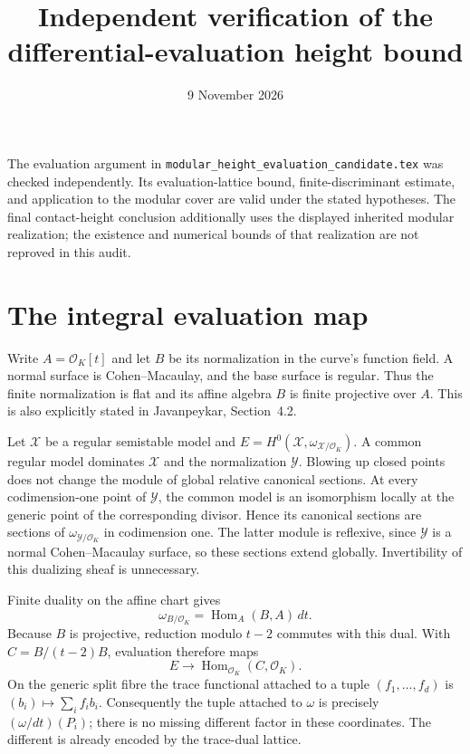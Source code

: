 \documentclass[11pt]{article}
\title{Independent verification of the differential-evaluation height bound}
\author{}\date{9 November 2026}
\newcommand{\OK}{\mathcal O_K}
\begin{document}
\maketitle

The evaluation argument in
\nolinkurl{modular_height_evaluation_candidate.tex} was checked
independently. Its evaluation-lattice bound, finite-discriminant
estimate, and application to the modular cover are valid under the
stated hypotheses. The final contact-height conclusion additionally
uses the displayed inherited modular realization; the existence and
numerical bounds of that realization are not reproved in this audit.

\section{The integral evaluation map}
Write $A=\OK[t]$ and let $B$ be its normalization in the curve's
function field. A normal surface is Cohen--Macaulay, and the base
surface is regular. Thus the finite normalization is flat and its
affine algebra $B$ is finite projective over $A$. This is also
explicitly stated in Javanpeykar, Section~4.2.

Let $\mathcal X$ be a regular semistable model and
$E=H^0(\mathcal X,\omega_{\mathcal X/\OK})$. A common regular
model dominates $\mathcal X$ and the normalization $\mathcal Y$.
Blowing up closed points does not change the module of global
relative canonical sections. At every codimension-one point of
$\mathcal Y$, the common model is an isomorphism locally at the
generic point of the corresponding divisor. Hence its canonical
sections are sections of $\omega_{\mathcal Y/\OK}$ in codimension
one. The latter module is reflexive, since $\mathcal Y$ is a
normal Cohen--Macaulay surface, so these sections extend globally.
Invertibility of this dualizing sheaf is unnecessary.

Finite duality on the affine chart gives
\[
 \omega_{B/\OK}=\operatorname{Hom}_A(B,A)\,dt.
\]
Because $B$ is projective, reduction modulo $t-2$ commutes with
this dual. With $C=B/(t-2)B$, evaluation therefore maps
\[
 E\longrightarrow\operatorname{Hom}_{\OK}(C,\OK).
\]
On the generic split fibre the trace functional attached to a tuple
$(f_1,\ldots,f_d)$ is $(b_i)\mapsto\sum_i f_ib_i$. Consequently
the tuple attached to $\omega$ is precisely
$(\omega/dt)(P_i)$; there is no missing different factor in these
coordinates. The different is already encoded by the trace-dual
lattice.
\end{document}
